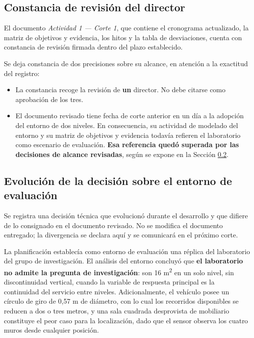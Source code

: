 \documentclass[12pt,letterpaper]{article}
\begin{document}
\subsection{Constancia de revisión del director}

El documento \textit{Actividad 1 --- Corte 1}, que contiene el cronograma actualizado, la matriz de objetivos y evidencia, los hitos y la tabla de desviaciones, cuenta con constancia de revisión firmada dentro del plazo establecido.

Se deja constancia de dos precisiones sobre su alcance, en atención a la exactitud del registro:

\begin{itemize}
    \item La constancia recoge la revisión de \textbf{un} director. No debe citarse como aprobación de los tres.
    \item El documento revisado tiene fecha de corte anterior en un día a la adopción del entorno de dos niveles. En consecuencia, su actividad de modelado del entorno y su matriz de objetivos y evidencia todavía refieren el laboratorio como escenario de evaluación. \textbf{Esa referencia quedó superada por las decisiones de alcance revisadas}, según se expone en la Sección \ref{sec:desviacion}.
\end{itemize}

\subsection{Evolución de la decisión sobre el entorno de evaluación}
\label{sec:desviacion}

Se registra una decisión técnica que evolucionó durante el desarrollo y que difiere de lo consignado en el documento revisado. No se modifica el documento entregado; la divergencia se declara aquí y se comunicará en el próximo corte.

La planificación establecía como entorno de evaluación una réplica del laboratorio del grupo de investigación. El análisis del entorno concluyó que \textbf{el laboratorio no admite la pregunta de investigación}: son 16 m\textsuperscript{2} en un solo nivel, sin discontinuidad vertical, cuando la variable de respuesta principal es la continuidad del servicio entre niveles. Adicionalmente, el vehículo posee un círculo de giro de 0,57 m de diámetro, con lo cual los recorridos disponibles se reducen a dos o tres metros, y una sala cuadrada desprovista de mobiliario constituye el peor caso para la localización, dado que el sensor observa los cuatro muros desde cualquier posición.
\end{document}
